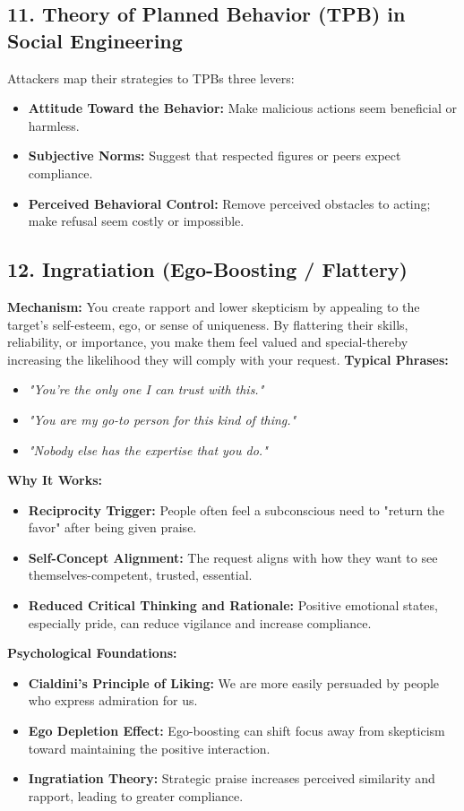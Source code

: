 {\subsection{11. Theory of Planned Behavior (TPB) in Social Engineering}
Attackers map their strategies to TPBs three levers:
\begin{itemize}
    \item \textbf{Attitude Toward the Behavior:} Make malicious actions seem beneficial or harmless.
    \item \textbf{Subjective Norms:} Suggest that respected figures or peers expect compliance.
    \item \textbf{Perceived Behavioral Control:} Remove perceived obstacles to acting; make refusal seem costly or impossible.

\end{itemize}

\subsection{12. Ingratiation (Ego-Boosting / Flattery)}
\textbf{Mechanism:} You create rapport and lower skepticism by appealing to the target's self-esteem, ego, or sense of uniqueness. By flattering their skills, reliability, or importance, you make them feel valued and special-thereby increasing the likelihood they will comply with your request.
\textbf{Typical Phrases:}
\begin{itemize}
    \item \textit{"You're the only one I can trust with this."}
    \item \textit{"You are my go-to person for this kind of thing."}
    \item \textit{"Nobody else has the expertise that you do."}
\end{itemize}
\textbf{Why It Works:}
\begin{itemize}
    \item \textbf{Reciprocity Trigger:} People often feel a subconscious need to "return the favor" after being given praise.
    \item \textbf{Self-Concept Alignment:} The request aligns with how they want to see themselves-competent, trusted, essential.
    \item \textbf{Reduced Critical Thinking and Rationale:} Positive emotional states, especially pride, can reduce vigilance and increase compliance.
\end{itemize}
\textbf{Psychological Foundations:}
\begin{itemize}
    \item \textbf{Cialdini's Principle of Liking:} We are more easily persuaded by people who express admiration for us.
    \item \textbf{Ego Depletion Effect:} Ego-boosting can shift focus away from skepticism toward maintaining the positive interaction.
    \item \textbf{Ingratiation Theory:} Strategic praise increases perceived similarity and rapport, leading to greater compliance.
\end{itemize}







}
